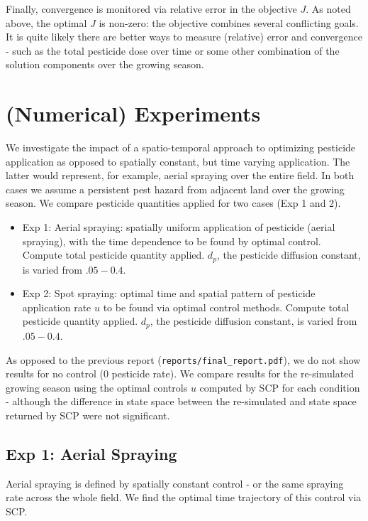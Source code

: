\documentclass[11pt]{article}
\begin{document}
Finally, convergence is monitored via relative error in the objective $J$. As noted above, the optimal $J$ is non-zero: the objective combines several conflicting goals. It is quite likely there are better ways to measure (relative) error and convergence - such as the total pesticide dose over time or some other combination of the solution components over the growing season.

\section{(Numerical) Experiments}

We investigate the impact of a spatio-temporal approach to optimizing pesticide application as opposed to spatially constant, but time varying application. The latter would represent, for example, aerial spraying over the entire field. In both cases we assume a persistent pest hazard from adjacent land over the growing season. We compare pesticide quantities applied for two cases (Exp 1 and 2).

\begin{itemize}
	\setlength\itemsep{-1pt}
	\item Exp 1: Aerial spraying: spatially uniform application of pesticide (aerial spraying), with the time dependence to be found by optimal control. Compute total pesticide quantity applied. $d_p$, the pesticide diffusion constant, is varied from $.05 - 0.4$.
	\item Exp 2: Spot spraying: optimal time and spatial pattern of pesticide application rate $u$ to be found via optimal control methods. Compute total pesticide quantity applied. $d_p$, the pesticide diffusion constant, is varied from $.05 - 0.4$.
\end{itemize}

As opposed to the previous report (\texttt{reports/final\_report.pdf}), we do not show results for no control (0 pesticide rate). We compare results for the re-simulated growing season using the optimal controls $u$ computed by SCP for each condition - although the difference in state space between the re-simulated and state space returned by SCP were not significant.

\subsection{Exp 1: Aerial Spraying}

Aerial spraying is defined by spatially constant control - or the same spraying rate across the whole field. We find the optimal time trajectory of this control via SCP. 
\end{document}

